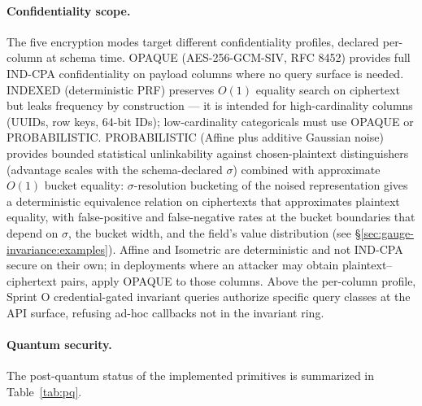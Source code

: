 \documentclass[11pt,letterpaper]{article}
\begin{document}
\paragraph{Confidentiality scope.}
The five encryption modes target different confidentiality
profiles, declared per-column at schema time. OPAQUE
(AES-256-GCM-SIV, RFC 8452) provides full IND-CPA confidentiality
on payload columns where no query surface is needed. INDEXED
(deterministic PRF) preserves $O(1)$ equality search on ciphertext
but leaks frequency by construction --- it is intended for
high-cardinality columns (UUIDs, row keys, 64-bit IDs);
low-cardinality categoricals must use OPAQUE or PROBABILISTIC.
PROBABILISTIC (Affine plus additive Gaussian noise) provides
bounded statistical unlinkability against chosen-plaintext
distinguishers (advantage scales with the schema-declared
$\sigma$) combined with approximate $O(1)$ bucket equality:
$\sigma$-resolution bucketing of the noised representation gives
a deterministic equivalence relation on ciphertexts that
approximates plaintext equality, with false-positive and
false-negative rates at the bucket boundaries that depend on
$\sigma$, the bucket width, and the field's value distribution
(see \S\ref{sec:gauge-invariance:examples}). Affine and
Isometric are deterministic and not IND-CPA secure on their own;
in deployments where an attacker may obtain
plaintext--ciphertext pairs, apply OPAQUE to those columns. Above
the per-column profile, Sprint O credential-gated invariant
queries authorize specific query classes at the API surface,
refusing ad-hoc callbacks not in the invariant ring.

\paragraph{Quantum security.}
The post-quantum status of the implemented primitives is
summarized in Table~\ref{tab:pq}.
\end{document}

